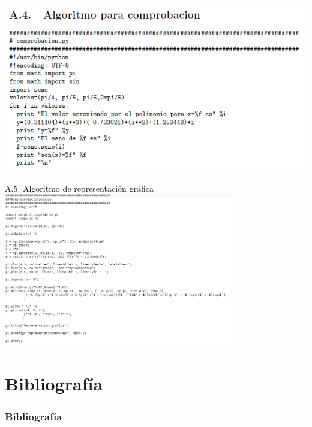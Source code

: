 \documentclass{beamer}
\begin{document}
\begin{frame}
  \includegraphics[width=1.0\textwidth]{img/Algoritmo4}
\end{frame}
\begin{frame}
A.5. Algoritmo de representación gráfica
  \includegraphics[width=0.75\textwidth]{img/Algoritmo5}
\end{frame}
\section{Bibliografía}
\begin{frame}
  \frametitle{Bibliografía}
    

    
\end{frame}

\end{document}

